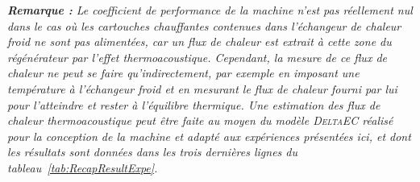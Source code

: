 

\textit{\textbf{Remarque :} Le coefficient de performance de la machine n'est pas réellement nul dans le cas où les cartouches chauffantes contenues dans l'échangeur de chaleur froid ne sont pas alimentées, car un flux de chaleur est extrait à cette zone du régénérateur par l'effet thermoacoustique. Cependant, la mesure de ce flux de chaleur ne peut se faire qu'indirectement, par exemple en imposant une température à l'échangeur froid et en mesurant le flux de chaleur fourni par lui pour l'atteindre et rester à l'équilibre thermique. Une estimation des flux de chaleur thermoacoustique peut être faite au moyen du modèle \textsc{DeltaEC} réalisé pour la conception de la machine et adapté aux expériences présentées ici, et dont les résultats sont données dans les trois dernières lignes du tableau~\ref{tab:RecapResultExpe}.}\medskip

